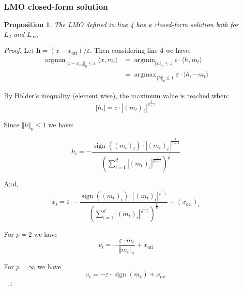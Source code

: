 \documentclass[10pt,twocolumn,letterpaper, english]{article}
\newcommand{\sign}{\mathop{\mathrm{sign}}}
\newcommand{\argmin}{\mathop{\mathrm{argmin}}}
\newcommand{\argmax}{\mathop{\mathrm{argmax}}}
\theoremstyle{definition}
\theoremstyle{plain}
\theoremstyle{plain}
\theoremstyle{plain}
\theoremstyle{plain}
\newtheorem{prop}{Proposition}[subsection]
\theoremstyle{remark}
\theoremstyle{remark}
\theoremstyle{definition}
\theoremstyle{definition}
\theoremstyle{definition}
\theoremstyle{definition}
\renewcommand{\epsilon}{\varepsilon}
\begin{document}
\subsubsection{LMO closed-form solution} \label{LMO}

\begin{prop}The LMO defined in line 4 has a closed-form solution both for $L_2$ and $L_\infty$. \\
\end{prop}
\begin{proof}
Let $\textbf{h}=(x - x_{\text{ori}})/ \epsilon$. Then considering line 4 we have:
\begin{align*}
    \argmin_{\Vert x - x_{\text{ori}} \Vert_p \le \epsilon} \langle x, m_t \rangle &= \argmin_{\Vert h \Vert_p \le 1} \epsilon \cdot \langle h,m_t \rangle \\
    &= \argmax_{\Vert h \Vert_p \le 1} \epsilon \cdot \langle h, -m_t \rangle 
\end{align*}

By H\"{o}lder's inequality (element wise), the maximum value is reached when: 
\begin{equation*}
    \left | h_i \right | = c \cdot \left | (m_t)_i \right |^{\frac{1}{p-1}}
\end{equation*}

Since $\Vert h \Vert_p \le 1$ we have:

\begin{equation*}
    h_i= - \frac{\sign((m_t)_i)\cdot \left | (m_t)_i \right |^{\frac{1}{p-1}}}{(\sum_{i=1}^d \left | (m_t)_i \right |^{\frac{1}{p-1}} )^{\frac{1}{p}}}
\end{equation*}

And,
\begin{equation*}
      x_i=\epsilon \cdot - \frac{\sign((m_t)_i)\cdot \left | (m_t)_i \right |^{\frac{1}{p-1}}}{(\sum_{i=1}^d \left | (m_t)_i \right |^{\frac{1}{p-1}} )^{\frac{1}{p}}} + (x_{\text{ori}})_i
\end{equation*}

For $p=2$ we have
\begin{equation*}
    v_t= - \frac{\epsilon \cdot m_t}{\Vert m_t \Vert_2} + x_{\text{ori}}
\end{equation*}

For $p= \infty$ we have
\begin{equation*}
    v_t = - \epsilon \cdot \sign(m_t) + x_{\text{ori}}
\end{equation*}
\end{proof}
\end{document}

